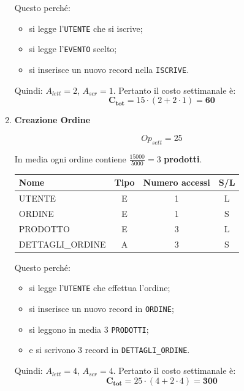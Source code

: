 \documentclass[a4paper,12pt]{report}
\begin{document}
\begin{enumerate}
    Questo perché:
    \begin{itemize}
        \item si legge l’\texttt{UTENTE} che si iscrive;
        \item si legge l’\texttt{EVENTO} scelto;
        \item si inserisce un nuovo record nella \texttt{ISCRIVE}.
    \end{itemize}

    Quindi: $A_{lett}=2$, $A_{scr}=1$.  
	Pertanto il costo settimanale è:
    $$\mathbf{C_{tot}} = 15 \cdot (2 + 2 \cdot 1) = \mathbf{60}$$
  

	\item {\large \textbf{Creazione Ordine}} \label{op11}

    $$
    {Op}_{sett} = 25
    $$

    In media ogni ordine contiene $\frac{15000}{5000}=3$ \textbf{prodotti}.

    \begin{table}[H]
    \centering
    \small
    \renewcommand{\arraystretch}{1.15}
    \begin{tabularx}{0.9\textwidth}{|X|c|c|c|}
        \hline
        \rowcolor{gray!20}
        \textbf{Nome} & \textbf{Tipo} & \textbf{Numero accessi} & \textbf{S/L} \\
        \hline
        UTENTE & E & 1 & L \\
        ORDINE & E & 1 & S \\
        PRODOTTO & E & 3 & L \\
        DETTAGLI\_ORDINE & A & 3 & S \\
        \hline
    \end{tabularx}
    \end{table}

    Questo perché:
    \begin{itemize}
        \item si legge l’\texttt{UTENTE} che effettua l’ordine;
        \item si inserisce un nuovo record in \texttt{ORDINE};
        \item si leggono in media 3 \texttt{PRODOTTI};
        \item e si scrivono 3 record in \texttt{DETTAGLI\_ORDINE}.
    \end{itemize}

    Quindi: $A_{lett}=4$, $A_{scr}=4$.  
	Pertanto il costo settimanale è:
    $$\mathbf{C_{tot}} = 25 \cdot (4 + 2 \cdot 4) = \mathbf{300}$$


\end{enumerate}
\end{document}
